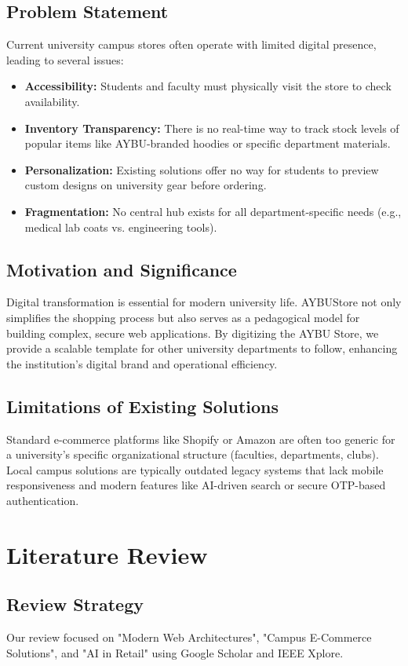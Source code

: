 \documentclass[11pt]{article}
\newcommand{\scorebox}[1]{%
  \hfill\fcolorbox{black}{gray!10}{\textbf{#1}}%
}
\newcommand{\scoredsection}[2]{\section{\texorpdfstring{#1~\scorebox{#2}}{#1}}}
\begin{document}
\subsection*{Problem Statement}
Current university campus stores often operate with limited digital presence, leading to several issues:
\begin{itemize}
    \item \textbf{Accessibility:} Students and faculty must physically visit the store to check availability.
    \item \textbf{Inventory Transparency:} There is no real-time way to track stock levels of popular items like AYBU-branded hoodies or specific department materials.
    \item \textbf{Personalization:} Existing solutions offer no way for students to preview custom designs on university gear before ordering.
    \item \textbf{Fragmentation:} No central hub exists for all department-specific needs (e.g., medical lab coats vs. engineering tools).
\end{itemize}

\subsection*{Motivation and Significance}
Digital transformation is essential for modern university life. AYBUStore not only simplifies the shopping process but also serves as a pedagogical model for building complex, secure web applications. By digitizing the AYBU Store, we provide a scalable template for other university departments to follow, enhancing the institution's digital brand and operational efficiency.

\subsection*{Limitations of Existing Solutions}
Standard e-commerce platforms like Shopify or Amazon are often too generic for a university's specific organizational structure (faculties, departments, clubs). Local campus solutions are typically outdated legacy systems that lack mobile responsiveness and modern features like AI-driven search or secure OTP-based authentication.

\scoredsection{Literature Review}{Related rubric: 15 pts + 10 pts}
\subsection*{Review Strategy}
Our review focused on "Modern Web Architectures", "Campus E-Commerce Solutions", and "AI in Retail" using Google Scholar and IEEE Xplore.
\end{document}
